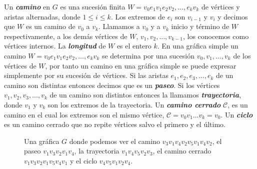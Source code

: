 \begin{definicion}
         Un\textbf{\textit{ camino}} en $G$ es una sucesi\'on finita $W= v_0e_1v_1e_2v_2, \dots ,
    e_kv_k$ de v\'ertices y aristas alternadas, donde $1 \le i \le k$. Los extremos de $e_i$ son $v_{i-1}$ y $v_i$ y
    decimos que $W$ es un camino de $v_0$ a $v_k$. Llamamos a $v_0$ y a $v_k$ inicio y t\'ermino de $W$
    respectivamente, a los dem\'as v\'ertices de $W$, $v_1, v_2, \dots,v_{k-1}$, los conocemos como v\'ertices
    internos. La \textbf{\textit{longitud}}  de $W$ es el entero $k$. En una gr\'afica simple un
    camino $W = v_0e_1v_1e_2v_2, \dots ,e_kv_k$ se determina por una sucesi\'on $v_0, v_1, \dots, v_k$ de los
    v\'ertices de $W$, por tanto un camino en una gr\'afica simple se puede expresar simplemente por su sucesi\'on de
    v\'ertices.
    Si las aristas $e_1,e_2,e_3,..., e_k$ de un camino son distintas entonces decimos que es un
    \textbf{\textit{paseo}}.
    Si los v\'ertices $v_1,v_2,v_3,...,v_k$ de un camino son distintos entonces la llamamos
    \textbf{\textit{trayectoria}},
    donde $v_1$ y $v_k$ son los extremos de la trayectoria.
    Un \textbf{\textit{camino cerrado}} $\mathscr{C}$, es un camino en el cual los
    extremos son el mismo v\'ertice, $\mathscr{C} = v_0 v_1 \dots v_k=v_0$. Un
    \textbf{\textit{ciclo}} es un camino cerrado que no repite v\'ertices salvo el primero y el
    \'ultimo.


    \begin{figure}[ht]
        \begin{center}
        \end{center}\caption{Una gr\'afica $G$ donde podemos ver el camino $v_3v_1v_4v_2v_5v_1v_4v_2$, el paseo
            $v_1v_3v_2v_1v_4$, la trayectoria $v_1v_4v_5v_2v_3$, el camino cerrado $v_1v_3v_2v_1v_5v_4v_1$ y el ciclo
            $v_4v_5v_1v_2v_4$.}
    \end{figure}



\end{definicion}
